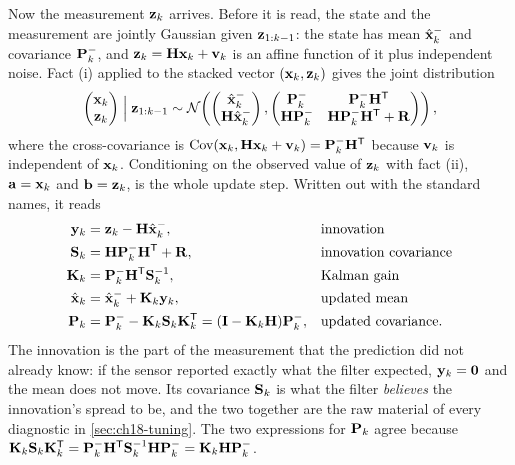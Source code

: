 Now the measurement $\mathbf{z}_k$ arrives. Before it is read, the state and the
measurement are jointly Gaussian given $\mathbf{z}_{1:k-1}$: the state has mean
$\hat{\mathbf{x}}^-_k$ and covariance $\mathbf{P}^-_k$, and
$\mathbf{z}_k=\mathbf{H}\mathbf{x}_k+\mathbf{v}_k$ is an affine function of it plus
independent noise. Fact (i) applied to the stacked vector
$(\mathbf{x}_k,\mathbf{z}_k)$ gives the joint distribution
\begin{equation}
  \begin{pmatrix}\mathbf{x}_k\\ \mathbf{z}_k\end{pmatrix}\Bigm|\mathbf{z}_{1:k-1}
  \sim\mathcal{N}\!\left(
  \begin{pmatrix}\hat{\mathbf{x}}^-_k\\ \mathbf{H}\hat{\mathbf{x}}^-_k\end{pmatrix},
  \begin{pmatrix}\mathbf{P}^-_k & \mathbf{P}^-_k\mathbf{H}^{\mathsf{T}}\\
                 \mathbf{H}\mathbf{P}^-_k & \mathbf{H}\mathbf{P}^-_k\mathbf{H}^{\mathsf{T}}+\mathbf{R}\end{pmatrix}\right),
  \label{eq:ch18-joint}
\end{equation}
where the cross-covariance is
$\operatorname{Cov}(\mathbf{x}_k,\mathbf{H}\mathbf{x}_k+\mathbf{v}_k)=\mathbf{P}^-_k\mathbf{H}^{\mathsf{T}}$ because
$\mathbf{v}_k$ is independent of $\mathbf{x}_k$. Conditioning on the observed value
of $\mathbf{z}_k$ with fact (ii), $\mathbf{a}=\mathbf{x}_k$ and $\mathbf{b}=\mathbf{z}_k$, is
the whole update step. Written out with the standard names, it reads
\begin{align}
  \vect{y}_k &= \meas_k-\mat{H}\hat{\state}^-_k, & &\text{innovation}\index{innovation}\label{eq:ch18-innovation}\\
  \mat{S}_k &= \mat{H}\mat{P}^-_k\mat{H}\T+\mat{R}, & &\text{innovation covariance}\label{eq:ch18-S}\\
  \Kgain_k &= \mat{P}^-_k\mat{H}\T\mat{S}_k\inv, & &\text{Kalman gain}\index{Kalman gain}\label{eq:ch18-gain}\\
  \hat{\state}_k &= \hat{\state}^-_k+\Kgain_k\vect{y}_k, & &\text{updated mean}\label{eq:ch18-update-mean}\\
  \mat{P}_k &= \mat{P}^-_k-\Kgain_k\mat{S}_k\Kgain_k\T=(\mat{I}-\Kgain_k\mat{H})\mat{P}^-_k, & &\text{updated covariance.}\label{eq:ch18-update-cov}
\end{align}
The innovation is the part of the measurement that the prediction did not
already know: if the sensor reported exactly what the filter expected,
$\mathbf{y}_k=\mathbf{0}$ and the mean does not move. Its covariance $\mathbf{S}_k$
is what the filter \emph{believes} the innovation's spread to be, and the two
together are the raw material of every diagnostic in \cref{sec:ch18-tuning}.
The two expressions for $\mathbf{P}_k$ agree because
$\mathbf{K}_k\mathbf{S}_k\mathbf{K}_k^{\mathsf{T}}=\mathbf{P}^-_k\mathbf{H}^{\mathsf{T}}\mathbf{S}_k^{-1}\mathbf{H}\mathbf{P}^-_k=\mathbf{K}_k\mathbf{H}\mathbf{P}^-_k$.

